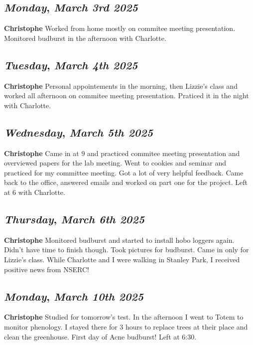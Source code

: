 \begin{center}
\section*{\month}
\end{center}

\def\day{\textit{March 3rd 2025}}
\def\weekday{\textit{Monday}}
\subsection*{\weekday, \day}
\textbf {Christophe}
Worked from home mostly on commitee meeting presentation. Monitored budburst in the afternoon with Charlotte.

\def\day{\textit{March 4th 2025}}
\def\weekday{\textit{Tuesday}}
\subsection*{\weekday, \day}
\textbf {Christophe}
Personal appointements in the morning, then Lizzie's class and worked all afternoon on commitee meeting presentation. Praticed it in the night with Charlotte.

\def\day{\textit{March 5th 2025}}
\def\weekday{\textit{Wednesday}}
\subsection*{\weekday, \day}
\textbf {Christophe}
Came in at 9 and practiced commitee meeting presentation and overviewed papers for the lab meeting. Went to cookies and seminar and practiced for my committee meeting. Got a lot of very helpful feedback. 
Came back to the office, answered emails and worked on part one for the project. Left at 6 with Charlotte.

\def\day{\textit{March 6th 2025}}
\def\weekday{\textit{Thursday}}
\subsection*{\weekday, \day}
\textbf {Christophe}
Monitored budburst and started to install hobo loggers again. Didn't have time to finish though. Took pictures for budburst. Came in only for Lizzie's class. While Charlotte and I were walking in Stanley Park, I received positive news from NSERC! 

\def\day{\textit{March 10th 2025}}
\def\weekday{\textit{Monday}}
\subsection*{\weekday, \day}
\textbf {Christophe}
Studied for tomorrow's test. In the afternoon I went to Totem to monitor phenology. I stayed there for 3 hours to replace trees at their place and clean the greenhouse. First day of Acne budburst! Left at 6:30.

